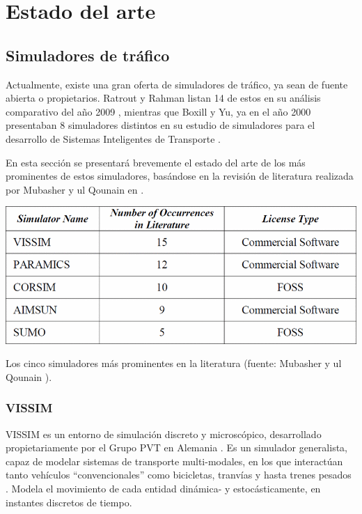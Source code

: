 \section{Estado del arte}

\subsection{Simuladores de tráfico}

Actualmente, existe una gran oferta de simuladores de tráfico, ya sean de fuente abierta o propietarios. Ratrout y Rahman listan 14 de estos en su análisis comparativo del año 2009 \autocite{ratrout2009comparative}, mientras que Boxill y Yu, ya en el año 2000 presentaban 8 simuladores distintos en su estudio de simuladores para el desarrollo de Sistemas Inteligentes de Transporte \autocite{boxill2000evaluation}.

En esta sección se presentará brevemente el estado del arte de los más prominentes de estos simuladores, basándose en la revisión de literatura realizada por Mubasher y ul Qounain en \autocite{traffic_sim_review}.

\begin{table}
    \centering
    \includegraphics[width=\linewidth]{figuras/popular_trafficsims}
    \caption[Tabla comparativa simuladores de tráfico.]{Los cinco simuladores más prominentes en la literatura (fuente: Mubasher y ul Qounain \autocite{traffic_sim_review}).}
    \label{table:prom_trafficsim}
\end{table}

\subsubsection{VISSIM}

VISSIM es un entorno de simulación discreto y microscópico, desarrollado propietariamente por el Grupo PVT en Alemania \autocite{vissim}. Es un simulador generalista, capaz de modelar sistemas de transporte multi-modales, en los que interactúan tanto vehículos ``convencionales'' como bicicletas, tranvías y hasta trenes pesados \autocite{fellendorf2010microscopic}. Modela el movimiento de cada entidad dinámica- y estocásticamente, en instantes discretos de tiempo. 

